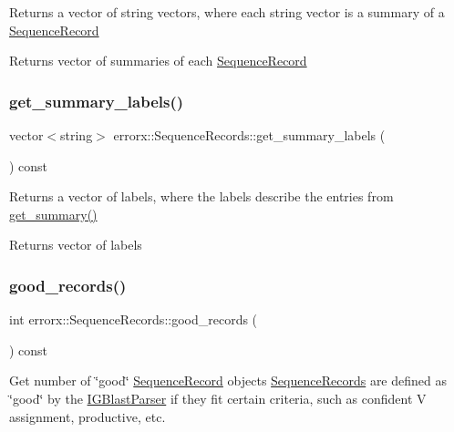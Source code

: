 Returns a vector of string vectors, where each string vector is a summary of a \mbox{\hyperlink{classerrorx_1_1_sequence_record}{Sequence\+Record}}

\begin{DoxyReturn}{Returns}
vector of summaries of each \mbox{\hyperlink{classerrorx_1_1_sequence_record}{Sequence\+Record}} 
\end{DoxyReturn}
\mbox{\label{classerrorx_1_1_sequence_records_a9b65dacacd35715b0ee039843d7d40d0}} 
\subsubsection{\texorpdfstring{get\+\_\+summary\+\_\+labels()}{get\_summary\_labels()}}
{\footnotesize\ttfamily vector$<$string$>$ errorx\+::\+Sequence\+Records\+::get\+\_\+summary\+\_\+labels (\begin{DoxyParamCaption}{ }\end{DoxyParamCaption}) const}

Returns a vector of labels, where the labels describe the entries from \mbox{\hyperlink{classerrorx_1_1_sequence_records_a426a62dad84bd4fe3a94a955c7b92330}{get\+\_\+summary()}}

\begin{DoxyReturn}{Returns}
vector of labels 
\end{DoxyReturn}
\mbox{\label{classerrorx_1_1_sequence_records_aa857b90f35804c6f6e179c18033ad838}} 
\subsubsection{\texorpdfstring{good\+\_\+records()}{good\_records()}}
{\footnotesize\ttfamily int errorx\+::\+Sequence\+Records\+::good\+\_\+records (\begin{DoxyParamCaption}{ }\end{DoxyParamCaption}) const}

Get number of \char`\"{}good\char`\"{} \mbox{\hyperlink{classerrorx_1_1_sequence_record}{Sequence\+Record}} objects \mbox{\hyperlink{classerrorx_1_1_sequence_records}{Sequence\+Records}} are defined as \char`\"{}good\char`\"{} by the \mbox{\hyperlink{classerrorx_1_1_i_g_blast_parser}{I\+G\+Blast\+Parser}} if they fit certain criteria, such as confident V assignment, productive, etc.

